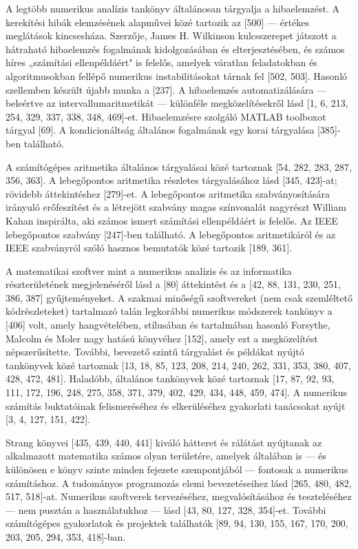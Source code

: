 \documentclass[
  magyar,
  11pt]{article}
\begin{document}
A legtöbb numerikus analízis tankönyv általánosan tárgyalja a
hibaelemzést. A kerekítési hibák elemzésének alapművei közé tartozik az
{[}500{]} --- értékes meglátások kincsesháza. Szerzője, James H.
Wilkinson kulcsszerepet játszott a hátraható hibaelemzés fogalmának
kidolgozásában és elterjesztésében, és számos híres „számítási
ellenpéldáért" is felelős, amelyek váratlan feladatokban és
algoritmusokban fellépő numerikus instabilitásokat tárnak fel {[}502,
503{]}. Hasonló szellemben készült újabb munka a {[}237{]}. A
hibaelemzés automatizálására --- beleértve az intervallumaritmetikát ---
különféle megközelítésekről lásd {[}1, 6, 213, 254, 329, 337, 338, 348,
469{]}-et. Hibaelemzésre szolgáló MATLAB toolboxot tárgyal {[}69{]}. A
kondicionáltság általános fogalmának egy korai tárgyalása {[}385{]}-ben
található.

A számítógépes aritmetika általános tárgyalásai közé tartoznak {[}54,
282, 283, 287, 356, 363{]}. A lebegőpontos aritmetika részletes
tárgyalásához lásd {[}345, 423{]}-at; rövidebb áttekintéshez
{[}279{]}-et. A lebegőpontos aritmetika szabványosítására irányuló
erőfeszítést és a létrejött szabvány magas színvonalát nagyrészt William
Kahan inspirálta, aki számos ismert számítási ellenpéldáért is felelős.
Az IEEE lebegőpontos szabvány {[}247{]}-ben található. A lebegőpontos
aritmetikáról és az IEEE szabványról szóló hasznos bemutatók közé
tartozik {[}189, 361{]}.

A matematikai szoftver mint a numerikus analízis és az informatika
részterületének megjelenéséről lásd a {[}80{]} áttekintést és a {[}42,
88, 131, 230, 251, 386, 387{]} gyűjteményeket. A szakmai minőségű
szoftvereket (nem csak szemléltető kódrészleteket) tartalmazó talán
legkorábbi numerikus módszerek tankönyv a {[}406{]} volt, amely
hangvételében, stílusában és tartalmában hasonló Forsythe, Malcolm és
Moler nagy hatású könyvéhez {[}152{]}, amely ezt a megközelítést
népszerűsítette. További, bevezető szintű tárgyalást és példákat nyújtó
tankönyvek közé tartoznak {[}13, 18, 85, 123, 208, 214, 240, 262, 331,
353, 380, 407, 428, 472, 481{]}. Haladóbb, általános tankönyvek közé
tartoznak {[}17, 87, 92, 93, 111, 172, 196, 248, 275, 358, 371, 379,
402, 429, 434, 448, 459, 474{]}. A numerikus számítás buktatóinak
felismeréséhez és elkerüléséhez gyakorlati tanácsokat nyújt {[}3, 4,
127, 151, 422{]}.

Strang könyvei {[}435, 439, 440, 441{]} kiváló hátteret és rálátást
nyújtanak az alkalmazott matematika számos olyan területére, amelyek
általában is --- és különösen e könyv szinte minden fejezete
szempontjából --- fontosak a numerikus számításhoz. A tudományos
programozás elemi bevezetéseihez lásd {[}265, 480, 482, 517, 518{]}-at.
Numerikus szoftverek tervezéséhez, megvalósításához és teszteléséhez ---
nem pusztán a használatukhoz --- lásd {[}43, 80, 127, 328, 354{]}-et.
További számítógépes gyakorlatok és projektek találhatók {[}89, 94, 130,
155, 167, 170, 200, 203, 205, 294, 353, 418{]}-ban.
\end{document}
